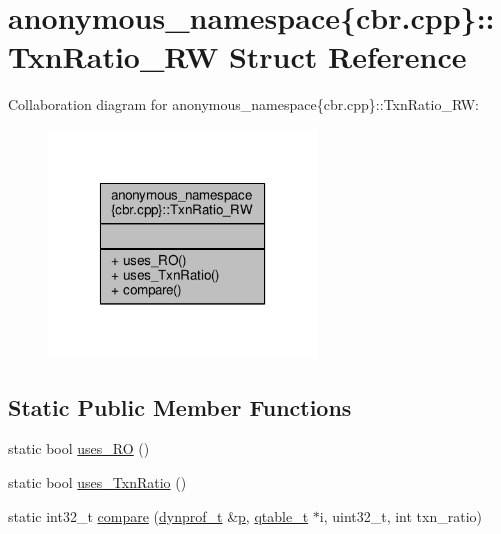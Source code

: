 \hypertarget{structanonymous__namespace_02cbr_8cpp_03_1_1TxnRatio__RW}{\section{anonymous\-\_\-namespace\{cbr.\-cpp\}\-:\-:Txn\-Ratio\-\_\-\-R\-W Struct Reference}
\label{structanonymous__namespace_02cbr_8cpp_03_1_1TxnRatio__RW}
}


Collaboration diagram for anonymous\-\_\-namespace\{cbr.\-cpp\}\-:\-:Txn\-Ratio\-\_\-\-R\-W\-:
\nopagebreak
\begin{figure}[H]
\begin{center}
\leavevmode
\includegraphics[width=202pt]{structanonymous__namespace_02cbr_8cpp_03_1_1TxnRatio__RW__coll__graph}
\end{center}
\end{figure}
\subsection*{Static Public Member Functions}
\begin{DoxyCompactItemize}
\item 
static bool \hyperlink{structanonymous__namespace_02cbr_8cpp_03_1_1TxnRatio__RW_af977f6a6854ed2ee3051782afe99165a}{uses\-\_\-\-R\-O} ()
\item 
static bool \hyperlink{structanonymous__namespace_02cbr_8cpp_03_1_1TxnRatio__RW_aa68341b4e2495e93038bac77d763ffba}{uses\-\_\-\-Txn\-Ratio} ()
\item 
static int32\-\_\-t \hyperlink{structanonymous__namespace_02cbr_8cpp_03_1_1TxnRatio__RW_a45bf26d69328aebcc97e12a9ef623e9d}{compare} (\hyperlink{structstm_1_1dynprof__t}{dynprof\-\_\-t} \&\hyperlink{counted__ptr_8hpp_a5c9f59d7c24e3fd6ceae319a968fc3e0}{p}, \hyperlink{structstm_1_1qtable__t}{qtable\-\_\-t} $\ast$i, uint32\-\_\-t, int txn\-\_\-ratio)
\end{DoxyCompactItemize}


